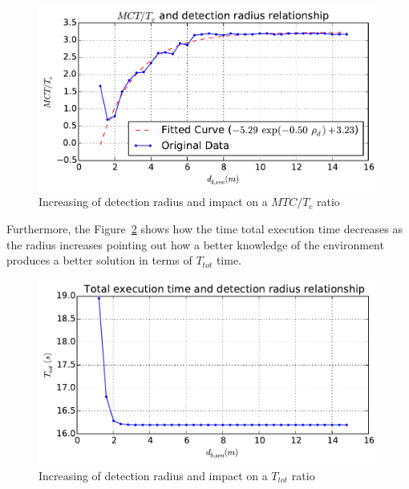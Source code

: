 \documentclass[eprint]{actapoly}
\begin{document}
\begin{figure}[!h]\centering
  \includegraphics[width=\linewidth]{./images/drho/drho-rmp.pdf} %
  \caption{Increasing of detection radius and impact on a $MTC/T_c$ 
ratio\label{fig:drhormp}}
\end{figure}

Furthermore, the Figure~\ref{fig:drhotot} shows how the time total execution time
decreases as the radius increases pointing out how a better knowledge of the
environment produces a better solution in terms of $T_{tot}$ time.


\begin{figure}[!h]\centering
  \includegraphics[width=\linewidth]{./images/drho/drho-tot.pdf}
  \caption{Increasing of detection radius and impact on a $T_{tot}$ 
ratio\label{fig:drhotot}}
\end{figure}
\end{document}
